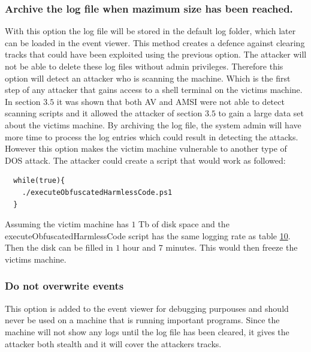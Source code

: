 \documentclass{article}%
\begin{document}
\subsubsection{Archive the log file when mazimum size has been reached.}
With this option the log file will be stored in the default log folder, which later can be loaded in the event viewer. This method creates a defence against clearing tracks that could have been exploited using the previous option. The attacker will not be able to delete these log files without admin privileges. Therefore this option will detect an attacker who is scanning the machine. Which is the first step of any attacker that gains access to a shell terminal on the victims machine. In section $3.5$ it was shown that both AV and AMSI were not able to detect scanning scripts and it allowed the attacker of section $3.5$ to gain a large data set about the victims machine. By archiving the log file, the system admin will have more time to process the log entries which could result in detecting the attacks. However this option makes the victim machine vulnerable to another type of DOS attack. The attacker could create a script that would work as followed:
\begin{verbatim}
  while(true){
  	./executeObfuscatedHarmlessCode.ps1
  }
\end{verbatim}
Assuming the victim machine has $1$ Tb of disk space and the executeObfuscatedHarmlessCode script has the same logging rate as table \hyperlink{table10}{10}. Then the disk can be filled in $1$ hour and $7$ minutes. This would then freeze the victims machine.
\subsubsection{Do not overwrite events}
This option is added to the event viewer for debugging purpouses and should never be used on a machine that is running important programs. Since the machine will not show any logs until the log file has been cleared, it gives the attacker both stealth and it will cover the attackers tracks. 
\end{document}
